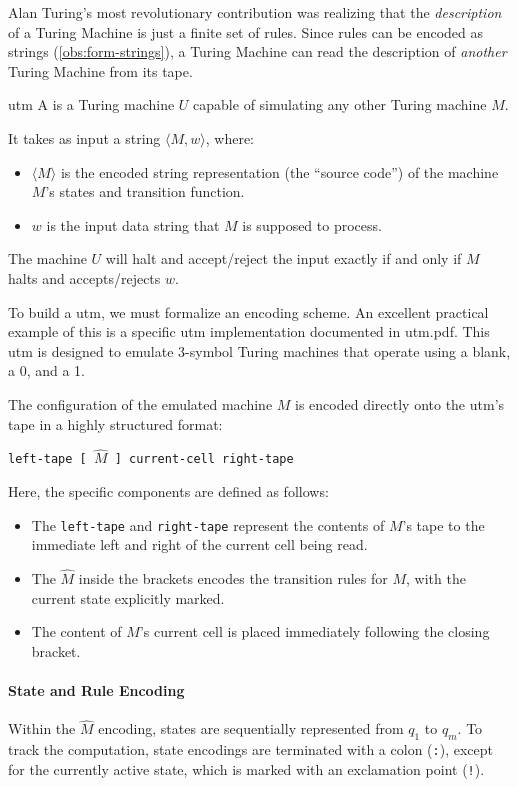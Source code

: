 Alan Turing's most revolutionary contribution was realizing that the \textit{description} of a Turing Machine is just a finite set of rules. Since rules can be encoded as strings (\cref{obs:form-strings}), a Turing Machine can read the description of \textit{another} Turing Machine from its tape.

\begin{definition}{}{utm}
    A \textbf{} is a Turing machine $U$ capable of simulating any other Turing machine $M$. 
    
    It takes as input a string $\langle M, w \rangle$, where:
    \begin{itemize}
        \item $\langle M \rangle$ is the encoded string representation (the ``source code'') of the machine $M$'s states and transition function.
        \item $w$ is the input data string that $M$ is supposed to process.
    \end{itemize}
    The machine $U$ will halt and accept/reject the input exactly if and only if $M$ halts and accepts/rejects $w$.
\end{definition}

To build a \gls{utm}, we must formalize an encoding scheme. An excellent practical example of this is a specific \gls{utm} implementation documented in utm.pdf. This \gls{utm} is designed to emulate 3-symbol Turing machines that operate using a blank, a 0, and a 1.

The configuration of the emulated machine $M$ is encoded directly onto the \gls{utm}'s tape in a highly structured format:
\begin{center}
    \texttt{left-tape [ $\hat{M}$ ] current-cell right-tape}
\end{center}
Here, the specific components are defined as follows:
\begin{itemize}
    \item The \texttt{left-tape} and \texttt{right-tape} represent the contents of $M$'s tape to the immediate left and right of the current cell being read.
    \item The $\hat{M}$ inside the brackets encodes the transition rules for $M$, with the current state explicitly marked.
    \item The content of $M$'s current cell is placed immediately following the closing bracket.
\end{itemize}

\paragraph{State and Rule Encoding}
Within the $\hat{M}$ encoding, states are sequentially represented from $q_1$ to $q_m$. To track the computation, state encodings are terminated with a colon (\texttt{:}), except for the currently active state, which is marked with an exclamation point (\texttt{!}). 

